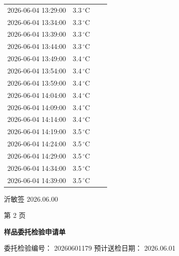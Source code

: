 \documentclass[UTF8,10pt,a4paper,fontset=fandol]{ctexart}
\newcommand{\fieldvalue}[1]{#1}
\newcommand{\handwritten}[1]{#1}
\begin{document}
\begin{flushleft}
\begin{tabular}{|p{3.35cm}|p{1.05cm}|p{3.35cm}|p{1.05cm}|}
2026-06-04 13:29:00 & 3.3\,${}^{\circ}$C & &\\
2026-06-04 13:34:00 & 3.3\,${}^{\circ}$C & &\\
2026-06-04 13:39:00 & 3.3\,${}^{\circ}$C & &\\
2026-06-04 13:44:00 & 3.3\,${}^{\circ}$C & &\\
2026-06-04 13:49:00 & 3.4\,${}^{\circ}$C & &\\
2026-06-04 13:54:00 & 3.4\,${}^{\circ}$C & &\\
2026-06-04 13:59:00 & 3.4\,${}^{\circ}$C & &\\
2026-06-04 14:04:00 & 3.4\,${}^{\circ}$C & &\\
2026-06-04 14:09:00 & 3.4\,${}^{\circ}$C & &\\
2026-06-04 14:14:00 & 3.4\,${}^{\circ}$C & &\\
2026-06-04 14:19:00 & 3.5\,${}^{\circ}$C & &\\
2026-06-04 14:24:00 & 3.5\,${}^{\circ}$C & &\\
2026-06-04 14:29:00 & 3.5\,${}^{\circ}$C & &\\
2026-06-04 14:34:00 & 3.5\,${}^{\circ}$C & &\\
2026-06-04 14:39:00 & 3.5\,${}^{\circ}$C & &\\
\hline
\end{tabular}

\vfill

\handwritten{沂敏签}
\hspace{2em}
\handwritten{2026.06.00}

\begin{center}
第 2 页
\end{center}
\end{flushleft}

\newpage

\begin{center}
\textbf{样品委托检验申请单}
\end{center}

\noindent
委托检验编号：
\fieldvalue{20260601179}
\hfill
预计送检日期：
\fieldvalue{2026.06.01}

\vspace{0.5em}
\end{document}
